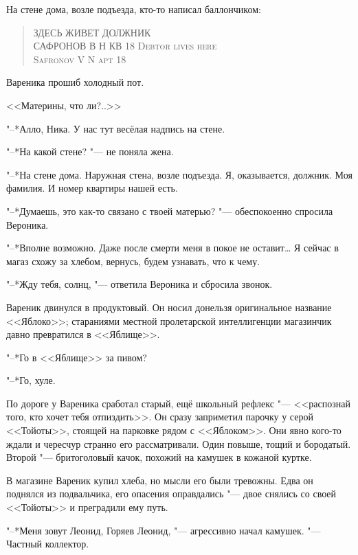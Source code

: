 \asterism

\textspace

\label{Mon_2012_06_04}

На стене дома, возле подъезда, кто-то написал баллончиком:

\begin{quote}
{ЗДЕСЬ ЖИВЕТ ДОЛЖНИК\\
САФРОНОВ В Н КВ 18}
{\textsc{Debtor lives here\\
Safronov V N apt 18}}
\end{quote}

Вареника прошиб холодный пот.

<<Материны, что ли?..>>

"--*Алло, Ника.
У нас тут весёлая надпись на стене.

"--*На какой стене? "--- не поняла жена.

"--*На стене дома.
Наружная стена, возле подъезда.
Я, оказывается, должник.
Моя фамилия.
И номер квартиры нашей есть.

"--*Думаешь, это как-то связано с твоей матерью? "--- обеспокоенно спросила Вероника.

"--*Вполне возможно.
Даже после смерти меня в покое не оставит\ldots{}
Я сейчас в магаз схожу за хлебом, вернусь, будем узнавать, что к чему.

"--*Жду тебя, солнц, "--- ответила Вероника и сбросила звонок.

Вареник двинулся в продуктовый.
Он носил донельзя оригинальное название <<Яблоко>>;
стараниями местной пролетарской интеллигенции магазинчик давно превратился в <<Яблище>>.

"--*Го в <<Яблище>> за пивом?

"--*Го, хуле.

По дороге у Вареника сработал старый, ещё школьный рефлекс "--- <<распознай того, кто хочет тебя отпиздить>>.
Он сразу заприметил парочку у серой <<Тойоты>>, стоящей на парковке рядом с <<Яблоком>>.
Они явно кого-то ждали и чересчур странно его рассматривали.
Один повыше, тощий и бородатый.
Второй "--- бритоголовый качок, похожий на камушек в кожаной куртке.

В магазине Вареник купил хлеба, но мысли его были тревожны.
Едва он поднялся из подвальчика, его опасения оправдались "--- двое снялись со своей <<Тойоты>> и преградили ему путь.

\asterism

"--*Меня зовут Леонид, Горяев Леонид, "--- агрессивно начал камушек.
"--- Частный коллектор.

